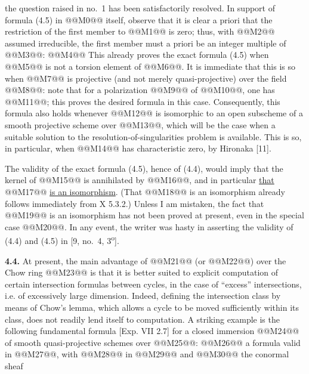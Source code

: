 the question raised in no.~1 has been satisfactorily resolved. In support of formula (4.5) in @@M0@@ itself, observe that it is clear a priori that the restriction of the first member to @@M1@@ is zero; thus, with @@M2@@ assumed irreducible, the first member must a priori be an integer multiple of @@M3@@:
@@M4@@
This already proves the exact formula (4.5) when @@M5@@ is not a torsion element of @@M6@@. It is immediate that this is so when @@M7@@ is projective (and not merely quasi-projective) over the field @@M8@@: note that for a polarization @@M9@@ of @@M10@@, one has @@M11@@; this proves the desired formula in this case. Consequently, this formula also holds whenever @@M12@@ is isomorphic to an open subscheme of a smooth projective scheme over @@M13@@, which will be the case when a suitable solution to the resolution-of-singularities problem is available. This is so, in particular, when @@M14@@ has characteristic zero, by Hironaka [11].

The validity of the exact formula (4.5), hence of (4.4), would imply that the kernel of @@M15@@ is annihilated by @@M16@@, and in particular \uline{that} @@M17@@ \uline{is an isomorphism}. (That @@M18@@ is an isomorphism already follows immediately from X 5.3.2.) Unless I am mistaken, the fact that @@M19@@ is an isomorphism has not been proved at present, even in the special case @@M20@@. In any event, the writer was hasty in asserting the validity of (4.4) and (4.5) in [9, no.~4, 3\textsuperscript{o}].

\textbf{4.4.} At present, the main advantage of @@M21@@ (or @@M22@@) over the Chow ring @@M23@@ is that it is better suited to explicit computation of certain intersection formulas between cycles, in the case of ``excess'' intersections, i.e. of excessively large dimension. Indeed, defining the intersection class by means of Chow's lemma, which allows a cycle to be moved sufficiently within its class, does not readily lend itself to computation. A striking example is the following fundamental formula [Exp. VII 2.7] for a closed immersion @@M24@@ of smooth quasi-projective schemes over @@M25@@:
@@M26@@
a formula valid in @@M27@@, with @@M28@@ in @@M29@@ and @@M30@@ the conormal sheaf
